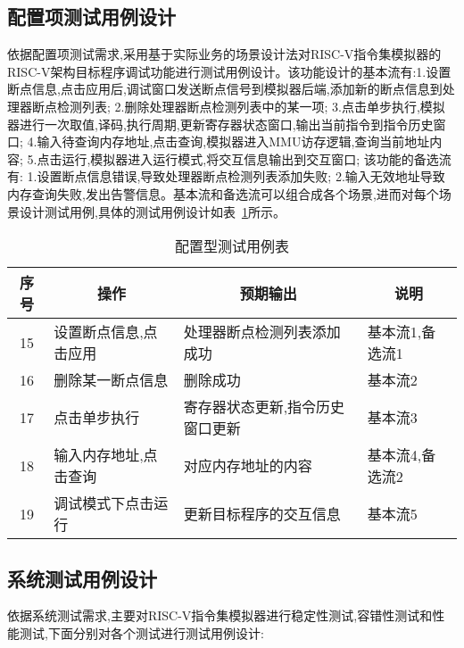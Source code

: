 \subsection{配置项测试用例设计}
依据配置项测试需求,采用基于实际业务的场景设计法对RISC-V指令集模拟器的RISC-V架构目标程序调试功能进行测试用例设计。该功能设计的基本流有:1.设置断点信息,点击应用后,调试窗口发送断点信号到模拟器后端,添加新的断点信息到处理器断点检测列表; 2.删除处理器断点检测列表中的某一项; 3.点击单步执行,模拟器进行一次取值,译码,执行周期,更新寄存器状态窗口,输出当前指令到指令历史窗口; 4.输入待查询内存地址,点击查询,模拟器进入MMU访存逻辑,查询当前地址内容; 5.点击运行,模拟器进入运行模式,将交互信息输出到交互窗口; 该功能的备选流有: 1.设置断点信息错误,导致处理器断点检测列表添加失败; 2.输入无效地址导致内存查询失败,发出告警信息。基本流和备选流可以组合成各个场景,进而对每个场景设计测试用例,具体的测试用例设计如表~\ref{tab:test5}所示。
\begin{table}[h]
    \centering
    \caption{配置型测试用例表}
    \label{tab:test5}
    \renewcommand\arraystretch{1.2}
    \begin{tabular}{clll}
      \toprule
      \multicolumn{1}{c}{序号} & \multicolumn{1}{c}{操作} & \multicolumn{1}{c}{预期输出} &\multicolumn{1}{c}{说明}\\
      \midrule
  15	& \multicolumn{1}{m{4cm}}{设置断点信息,点击应用} & \multicolumn{1}{m{3.5cm}}{处理器断点检测列表添加成功} & \multicolumn{1}{m{3cm}}{基本流1,备选流1}\\
  \hline
  16	& \multicolumn{1}{m{4cm}}{删除某一断点信息} & \multicolumn{1}{m{3.5cm}}{删除成功} & \multicolumn{1}{m{3cm}}{基本流2}\\
  \hline
  17	& \multicolumn{1}{m{4cm}}{点击单步执行} & \multicolumn{1}{m{3.5cm}}{寄存器状态更新,指令历史窗口更新} & \multicolumn{1}{m{3cm}}{基本流3}\\
  \hline
  18	& \multicolumn{1}{m{4cm}}{输入内存地址,点击查询} & \multicolumn{1}{m{3.5cm}}{对应内存地址的内容} & \multicolumn{1}{m{3cm}}{基本流4,备选流2}\\
  \hline
  19	& \multicolumn{1}{m{4cm}}{调试模式下点击运行} & \multicolumn{1}{m{3.5cm}}{更新目标程序的交互信息} & \multicolumn{1}{m{3cm}}{基本流5}\\
      \bottomrule
    \end{tabular}
\end{table}


\subsection{系统测试用例设计}
依据系统测试需求,主要对RISC-V指令集模拟器进行稳定性测试,容错性测试和性能测试,下面分别对各个测试进行测试用例设计:


